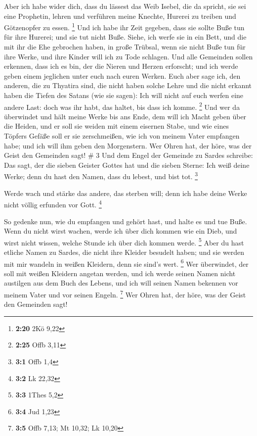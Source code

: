  Aber ich habe wider dich, dass du lässest das Weib Isebel,
die da spricht, sie sei eine Prophetin, lehren und verführen meine
Knechte, Hurerei zu treiben und Götzenopfer zu essen. \footnote{\textbf{2:20}
  2Kö 9,22}  Und ich habe ihr Zeit gegeben, dass sie sollte
Buße tun für ihre Hurerei; und sie tut nicht Buße.  Siehe,
ich werfe sie in ein Bett, und die mit ihr die Ehe gebrochen haben, in
große Trübsal, wenn sie nicht Buße tun für ihre Werke,  und
ihre Kinder will ich zu Tode schlagen. Und alle Gemeinden sollen
erkennen, dass ich es bin, der die Nieren und Herzen erforscht; und ich
werde geben einem jeglichen unter euch nach euren Werken. 
Euch aber sage ich, den anderen, die zu Thyatira sind, die nicht haben
solche Lehre und die nicht erkannt haben die Tiefen des Satans (wie sie
sagen): Ich will nicht auf euch werfen eine andere Last: 
doch was ihr habt, das haltet, bis dass ich komme. \footnote{\textbf{2:25}
  Offb 3,11}  Und wer da überwindet und hält meine Werke
bis ans Ende, dem will ich Macht geben über die Heiden, 
und er soll sie weiden mit einem eisernen Stabe, und wie eines Töpfers
Gefäße soll er sie zerschmeißen,  wie ich von meinem Vater
empfangen habe; und ich will ihm geben den Morgenstern. 
Wer Ohren hat, der höre, was der Geist den Gemeinden sagt! \# 3
 Und dem Engel der Gemeinde zu Sardes schreibe: Das sagt,
der die sieben Geister Gottes hat und die sieben Sterne: Ich weiß deine
Werke; denn du hast den Namen, dass du lebest, und bist tot. \footnote{\textbf{3:1}
  Offb 1,4}

 Werde wach und stärke das andere, das sterben will; denn
ich habe deine Werke nicht völlig erfunden vor Gott. \footnote{\textbf{3:2}
  Lk 22,32}

 So gedenke nun, wie du empfangen und gehört hast, und halte
es und tue Buße. Wenn du nicht wirst wachen, werde ich über dich kommen
wie ein Dieb, und wirst nicht wissen, welche Stunde ich über dich kommen
werde. \footnote{\textbf{3:3} 1Thes 5,2}  Aber du hast
etliche Namen zu Sardes, die nicht ihre Kleider besudelt haben; und sie
werden mit mir wandeln in weißen Kleidern, denn sie sind's wert.
\footnote{\textbf{3:4} Jud 1,23}  Wer überwindet, der soll
mit weißen Kleidern angetan werden, und ich werde seinen Namen nicht
austilgen aus dem Buch des Lebens, und ich will seinen Namen bekennen
vor meinem Vater und vor seinen Engeln. \footnote{\textbf{3:5} Offb
  7,13; Mt 10,32; Lk 10,20}  Wer Ohren hat, der höre, was
der Geist den Gemeinden sagt!

